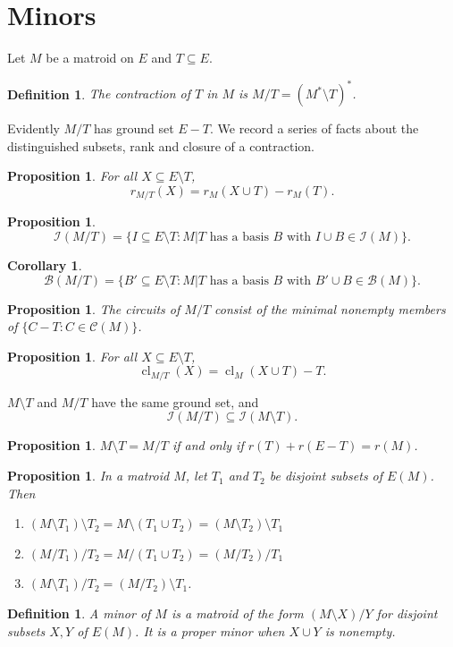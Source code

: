 \documentclass[11pt,letterpaper]{article}
\newcommand{\I}{\mathcal{I}}
\newcommand{\B}{\mathcal{B}}
\newcommand{\C}{\mathcal{C}}
\DeclareMathOperator{\cl}{cl}
\theoremstyle{appendix-result}
\newtheorem{proposition}[theorem]{Proposition}
\newtheorem{corollary}[theorem]{Corollary}
\theoremstyle{appendix-definition}
\newtheorem{definition}[theorem]{Definition}
\begin{document}
\section{Minors}
Let $M$ be a matroid on $E$ and $T\subseteq E$.
\begin{definition}
    The contraction of $T$ in $M$ is $M/T = (M^*\setminus T)^*$.
\end{definition}
Evidently $M/T$ has ground set $E-T$. We record a series of facts about the distinguished subsets, rank and closure of a contraction.
\begin{proposition}
    For all $X \subseteq E\setminus T$,
    \[r_{M/T}(X) = r_M(X \cup T)-r_M(T). \]
\end{proposition}
\begin{proposition}
    \[\I(M/T) = \{I \subseteq E\setminus T: \text{$M \vert T$ has a basis $B$ with $I \cup B \in \I(M)$}\}.\]
\end{proposition}
\begin{corollary}
    \[\B(M/T) = \{B' \subseteq E\setminus T: \text{$M \vert T$ has a basis $B$ with $B' \cup B \in \B(M)$}\}.\]
\end{corollary}
\begin{proposition}
    The circuits of $M/T$ consist of the minimal nonempty members of $\{C-T:C \in \C(M)\}$.
\end{proposition}
\begin{proposition}
    For all $X \subseteq E\setminus T$,
    \[\cl_{M/T}(X) = \cl_M(X \cup T)-T.\]
\end{proposition}
$M\setminus T$ and $M/T$ have the same ground set, and
\[\I(M/T)\subseteq \I(M\setminus T).\]
\begin{proposition}
    $M \setminus T = M/T$ if and only if $r(T)+r(E-T)=r(M)$.
\end{proposition}
\begin{proposition}
    In a matroid $M$, let $T_1$ and $T_2$ be disjoint subsets of $E(M)$. Then
    \begin{enumerate}
        \item $(M\setminus T_1)\setminus T_2 = M \setminus (T_1 \cup T_2) = (M\setminus T_2)\setminus T_1$
        \item $(M/ T_1)/ T_2 = M / (T_1 \cup T_2) = (M/ T_2)/ T_1$
        \item $(M \setminus T_1)/T_2 = (M/T_2)\setminus T_1$.
    \end{enumerate}
\end{proposition}
\begin{definition}
    A minor of $M$ is a matroid of the form $(M\setminus X)/Y$ for disjoint subsets $X,Y$ of $E(M)$. It is a proper minor when $X\cup Y$ is nonempty.
\end{definition}
\end{document}
